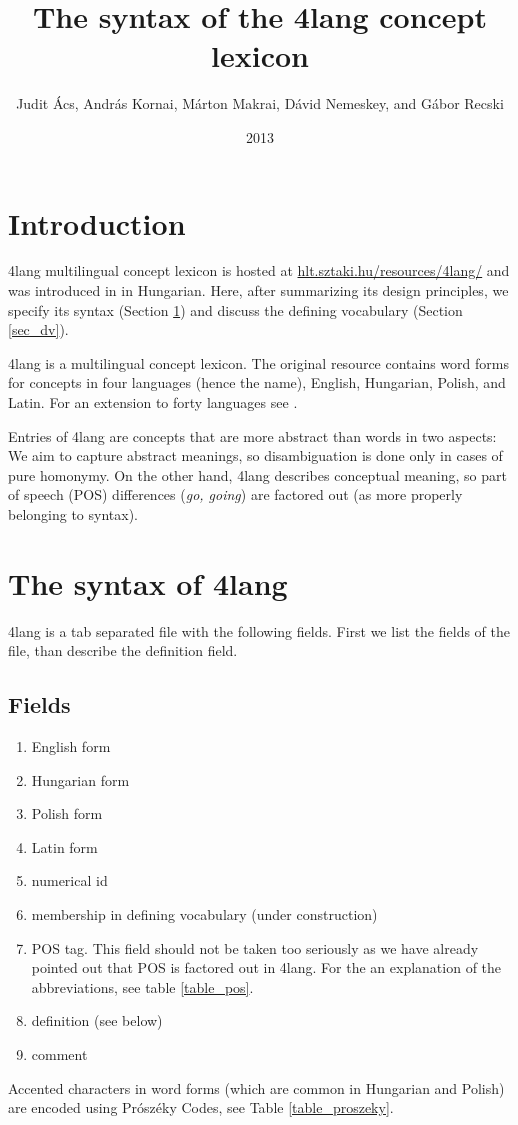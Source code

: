 \documentclass[a4paper,10pt]{article}
\title{The syntax of the 4lang concept lexicon}
\author{Judit Ács, András Kornai, Márton Makrai, Dávid Nemeskey, and Gábor Recski}
\date{2013}
\begin{document}
\maketitle
\section*{Introduction}
4lang multilingual concept lexicon is hosted at
\url{hlt.sztaki.hu/resources/4lang/} and was introduced in \cite{Kornai:2013}
in Hungarian. Here, after summarizing its design principles, we specify
its syntax (Section \ref{sec_synt}) and discuss the defining vocabulary
(Section \ref{sec_dv}).

4lang is a multilingual concept lexicon. The original resource contains word
forms for concepts in four languages (hence the name), English, Hungarian,
Polish, and Latin. For an extension to forty languages see \cite{Acs:2013}.

Entries of 4lang are concepts that are more abstract than words in two
aspects: We aim to capture abstract meanings, so disambiguation is done only
in cases of pure homonymy. On the other hand, 4lang describes conceptual
meaning, so part of speech (POS) differences (\emph{go, going}) are factored
out (as more properly belonging to syntax).
\section{The syntax of 4lang}\label{sec_synt}
4lang is a tab separated file with the following fields. First we list the fields of the file, than describe the definition field.
\subsection{Fields}
\begin{enumerate}
 \item English form
\item Hungarian form
\item Polish form
\item Latin form
\item numerical id
\item membership in defining vocabulary (under construction)
\item POS tag. This field should not be taken too seriously as we have already pointed out that POS is factored out in 4lang. For the an explanation of the abbreviations, see table \ref{table_pos}.
\item definition (see below)
\item comment
\end{enumerate}
Accented characters in word forms (which are common in Hungarian and Polish)
are encoded using Prószéky Codes, see Table \ref{table_proszeky}.
\end{document}
